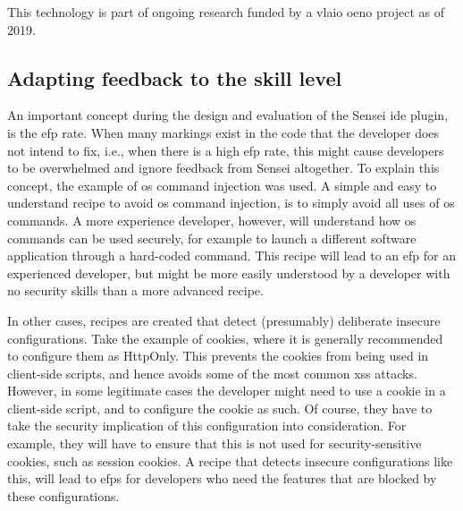 This technology is part of ongoing research funded by a \gls{vlaio} \gls{oeno} project as of 2019.

\subsection{Adapting feedback to the skill level}
An important concept during the design and evaluation of the Sensei \gls{ide} plugin, is the \gls{efp} rate.
When many markings exist in the code that the developer does not intend to fix, i.e., when there is a high \gls{efp} rate, this might cause developers to be overwhelmed and ignore feedback from Sensei altogether.
To explain this concept, the example of \gls{os} command injection was used.
A simple and easy to understand recipe to avoid \gls{os} command injection, is to simply avoid all uses of \gls{os} commands.
A more experience developer, however, will understand how \gls{os} commands can be used securely, for example to launch a different software application through a hard-coded command.
This recipe will lead to an \gls{efp} for an experienced developer, but might be more easily understood by a developer with no security skills than a more advanced recipe.

In other cases, recipes are created that detect (presumably) deliberate insecure configurations.
Take the example of cookies, where it is generally recommended to configure them as HttpOnly.
This prevents the cookies from being used in client-side scripts, and hence avoids some of the most common \gls{xss} attacks.
However, in some legitimate cases the developer might need to use a cookie in a client-side script, and to configure the cookie as such.
Of course, they have to take the security implication of this configuration into consideration.
For example, they will have to ensure that this is not used for security-sensitive cookies, such as session cookies.
A recipe that detects insecure configurations like this, will lead to \glspl{efp} for developers who need the features that are blocked by these configurations.

